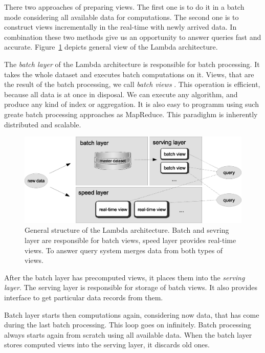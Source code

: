 There two approaches of preparing views.
The first one is to do it in a batch mode considering all available data for computations.
The second one is to construct views incrementally in the real-time with newly arrived data.
In combination these two methods give us an opportunity to answer queries fast and accurate.
Figure~\ref{fig:lambda_architecture} depicts general view of the Lambda architecture.

The \textit{batch layer}  of the Lambda architecture is responsible for batch processing.
It takes the whole dataset and executes batch computations on it.
Views, that are the result of the batch processing, we call \textit{batch views} . 
This operation is efficient, because all data is at once in disposal.
We can execute any algorithm, and produce any kind of index or aggregation.
It is also easy to programm using such greate batch processing approaches as MapReduce.
This paradighm is inherently distributed and scalable.

\begin{figure}
  \centering
  \includegraphics [width=1.0\textwidth]{images/LambdaArchitecture}
  \caption{General structure of the Lambda architecture. Batch and sevring layer are responsible for batch views, speed layer provides real-time views. To answer query system merges data from both types of views.}
  \label{fig:lambda_architecture}
\end{figure}

After the batch layer has precomputed views, it places them into the \textit{serving layer}.
The serving layer is responsible for storage of batch views.
It also provides interface to get particular data records from them. 

Batch layer starts then computations again, considering now data, that has come during the last batch processing.
This loop goes on infinitely.
Batch processing always starts again from scratch using all available data.
When the batch layer stores computed views into the serving layer, it discards old ones.

